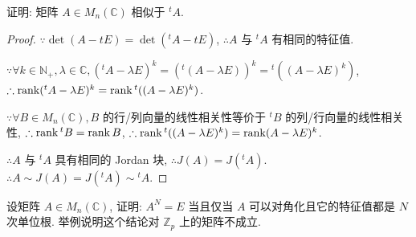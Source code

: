 \documentclass[color=black,device=normal,lang=cn,mode=geye]{elegantnote}
\begin{document}
\begin{exercise}%
    证明: 矩阵 $A\in M_n(\mathbb{C})$ 相似于 $^tA$.
\end{exercise}
\begin{proof}
    $\because\det(A-tE)=\det({}^tA-tE)$, $\therefore A$ 与 $^tA$ 有相同的特征值.

    $\because\forall k\in\mathbb{N}_+,\lambda\in\mathbb{C},({}^tA-\lambda E)^k=({}^t(A-\lambda E))^k={}^t((A-\lambda E)^k)$, $\therefore\operatorname{rank} ({}^tA-\lambda E)^k=\operatorname{rank} {}^t((A-\lambda E)^k)$.
    
    $\because\forall B\in M_n(\mathbb{C}),B$ 的行/列向量的线性相关性等价于 $^tB$ 的列/行向量的线性相关性, $\therefore\operatorname{rank} {}^tB=\operatorname{rank} B$, $\therefore\operatorname{rank} {}^t((A-\lambda E)^k)=\operatorname{rank} (A-\lambda E)^k$.
    
    $\therefore A$ 与 $^tA$ 具有相同的 Jordan 块, $\therefore J(A)=J({}^tA)$. $\therefore A\sim J(A)=J({}^tA)\sim{}^tA$.
\end{proof}
\begin{exercise}[按照 2.5.11 修改]%
    设矩阵 $A\in M_n(\mathbb{C})$, 证明: $A^N=E$ 当且仅当 $A$ 可以对角化且它的特征值都是 $N$ 次单位根. 举例说明这个结论对 $\mathbb{Z}_p$ 上的矩阵不成立.
\end{exercise}
\end{document}
